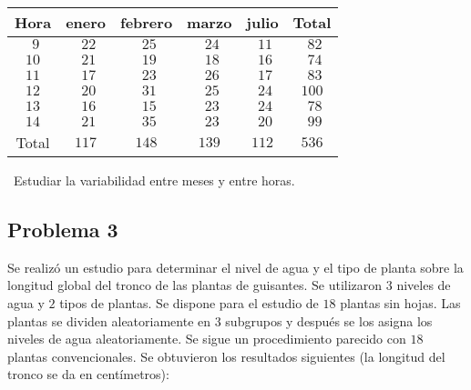 \documentclass[
]{article}
\begin{document}
\begin{center}
\begin{tabular}{|c||c|c|c|c||c|}
\hline
Hora&enero&febrero&marzo&julio&Total\\\hline\hline
$\ \,9$&$\ \,22$&$\ \,25$&$\ \,24$&$\ \,11$&$\ \,82$\\\hline
$10$&$\ \,21$&$\ \,19$&$\ \,18$&$\ \,16$&$\ \,74$\\\hline
$11$&$\ \,17$&$\ \,23$&$\ \,26$&$\ \,17$&$\ \,83$\\\hline
$12$&$\ \,20$&$\ \,31$&$\ \,25$&$\ \,24$&$100$\\\hline
$13$&$\ \,16$&$\ \,15$&$\ \,23$&$\ \,24$&$\ \,78$\\\hline
$14$&$\ \,21$&$\ \,35$&$\ \,23$&$\ \,20$&$\ \,99$\\\hline\hline
Total&$117$&$148$&$139$&$112$&$536$\\\hline
\end{tabular}
\end{center}

~\newline Estudiar la variabilidad entre meses y entre horas.

\hypertarget{problema-3}{%
\subsection{Problema 3}\label{problema-3}}

Se realizó un estudio para determinar el nivel de agua y el tipo de
planta sobre la longitud global del tronco de las plantas de guisantes.
Se utilizaron \(3\) niveles de agua y \(2\) tipos de plantas. Se dispone
para el estudio de \(18\) plantas sin hojas. Las plantas se dividen
aleatoriamente en \(3\) subgrupos y después se los asigna los niveles de
agua aleatoriamente. Se sigue un procedimiento parecido con \(18\)
plantas convencionales. Se obtuvieron los resultados siguientes (la
longitud del tronco se da en centímetros): ~\newline
\end{document}
